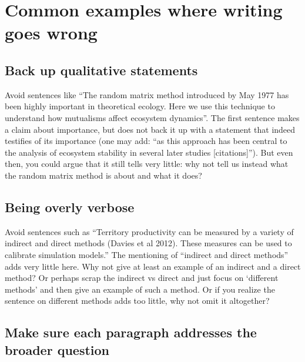 \documentclass[
]{book}
\begin{document}
\hypertarget{common-examples-where-writing-goes-wrong}{%
\section{Common examples where writing goes wrong}\label{common-examples-where-writing-goes-wrong}}

\hypertarget{back-up-qualitative-statements}{%
\subsection{Back up qualitative statements}\label{back-up-qualitative-statements}}

Avoid sentences like ``The random matrix method introduced by May 1977 has been highly important in theoretical ecology. Here we use this technique to understand how mutualisms affect ecosystem dynamics''. The first sentence makes a claim about importance, but does not back it up with a statement that indeed testifies of its importance (one may add: ``as this approach has been central to the analysis of ecosystem stability in several later studies {[}citations{]}''). But even then, you could argue that it still tells very little: why not tell us instead what the random matrix method is about and what it does?

\hypertarget{being-overly-verbose}{%
\subsection{Being overly verbose}\label{being-overly-verbose}}

Avoid sentences such as ``Territory productivity can be measured by a variety of
indirect and direct methods (Davies et al 2012). These measures
can be used to calibrate simulation models.'' The mentioning of
``indirect and direct methods'' adds very little here. Why not give at least an
example of an indirect and a direct method? Or perhaps scrap the indirect vs direct and
just focus on `different methods' and then give an example of such a method.
Or if you realize the sentence on different methods adds too little, why not omit it altogether?

\hypertarget{make-sure-each-paragraph-addresses-the-broader-question}{%
\subsection{Make sure each paragraph addresses the broader question}\label{make-sure-each-paragraph-addresses-the-broader-question}}
\end{document}
